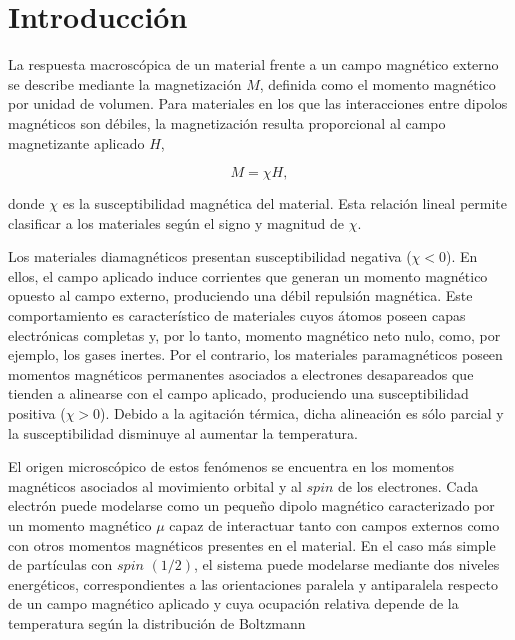 \section{Introducción}

La respuesta macroscópica de un material frente a un campo magnético externo se describe mediante la magnetización $M$, definida como el momento magnético por unidad de volumen. Para materiales en los que las interacciones entre dipolos magnéticos son débiles, la magnetización resulta proporcional al campo magnetizante aplicado $H$,

\begin{equation}
M=\chi H,
\label{MchiH}
\end{equation}

donde $\chi$ es la susceptibilidad magnética del material. Esta relación lineal permite clasificar a los materiales según el signo y magnitud de $\chi$. \cite{Bruvera}

Los materiales diamagnéticos presentan susceptibilidad negativa ($\chi<0$). En ellos, el campo aplicado induce corrientes que generan un momento magnético opuesto al campo externo, produciendo una débil repulsión magnética. Este comportamiento es característico de materiales cuyos átomos poseen capas electrónicas completas y, por lo tanto, momento magnético neto nulo, como, por ejemplo, los gases inertes. Por el contrario, los materiales paramagnéticos poseen momentos magnéticos permanentes asociados a electrones desapareados que tienden a alinearse con el campo aplicado, produciendo una susceptibilidad positiva ($\chi>0$). Debido a la agitación térmica, dicha alineación es sólo parcial y la susceptibilidad disminuye al aumentar la temperatura. \cite{Bruvera} \cite{Kittel} 

El origen microscópico de estos fenómenos se encuentra en los momentos magnéticos asociados al movimiento orbital y al $spin$ de los electrones. Cada electrón puede modelarse como un pequeño dipolo magnético caracterizado por un momento magnético $\mu$ capaz de interactuar tanto con campos externos como con otros momentos magnéticos presentes en el material. En el caso más simple de partículas con $spin$ $(1/2)$, el sistema puede modelarse mediante dos niveles energéticos, correspondientes a las orientaciones paralela y antiparalela respecto de un campo magnético aplicado y cuya ocupación relativa depende de la temperatura según la distribución de Boltzmann \cite{Kittel} 

